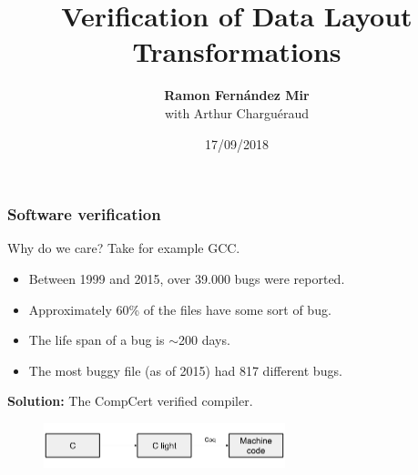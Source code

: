 \def\macrosUseBeamer{}



\usepackage{fancyvrb}
\usepackage{graphicx}
\usepackage{multicol}

\newcommand\tab{$\hphantom{--}$}

\usepackage{ebproof}





\title{Verification of Data Layout Transformations}
\author[Ramon Fern\'{a}ndez Mir]{{\bf Ramon Fern\'{a}ndez Mir}\\ \vspace{1em} with Arthur Charguéraud }
\date{17/09/2018}

\frame{\titlepage}





\begin{frame}[fragile]
\frametitle{Software verification}

Why do we care? Take for example GCC.
\begin{itemize}
	\item Between 1999 and 2015, over 39.000 bugs were reported.
	\item Approximately 60\% of the files have some sort of bug.
	\item The life span of a bug is $\sim$200 days.
	\item The most buggy file (as of 2015) had 817 different bugs. 
\end{itemize}

\bigskip \pause

\textbf{Solution:} The CompCert verified compiler.
\begin{figure}[H]
\centering
\includegraphics[width=7cm]{images/compcert}
\end{figure}

\end{frame}


